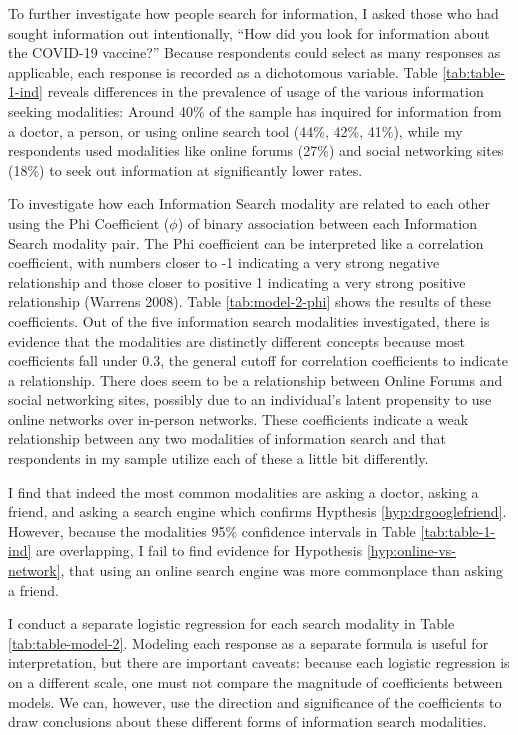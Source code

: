 To further investigate how people search for information, I asked those who had
sought information out intentionally, ``How did you look for information about
the COVID-19 vaccine?'' Because respondents could select as many responses as
applicable, each response is recorded as a dichotomous variable. Table
\ref{tab:table-1-ind} reveals differences in the prevalence of usage of the
various information seeking modalities: Around 40\% of the sample has inquired for
information from a doctor, a person, or using online search tool (44\%, 42\%, 41\%), while my
respondents used modalities like online forums (27\%) and social networking sites (18\%)
to seek out information at significantly lower rates.

To investigate how each
Information Search modality are related to each other using the Phi Coefficient
($\phi$) of binary association between each Information Search modality pair.
The Phi coefficient can be interpreted like a correlation coefficient, with
numbers closer to -1 indicating a very strong negative relationship and those closer to 
positive 1 indicating a very strong positive relationship
(Warrens 2008). Table \ref{tab:model-2-phi} shows the results of these
coefficients. Out of the five information search modalities investigated, there is
evidence that the modalities are distinctly different concepts because most
coefficients fall under 0.3, the general cutoff for correlation
coefficients to indicate a relationship. There does seem to be a relationship
between Online Forums and social networking sites, possibly due to an
individual's latent propensity to use online networks over in-person networks. These
coefficients indicate a weak relationship between any two modalities of
information search and that respondents in my sample utilize each of these a
little bit differently. 

I find that indeed the most common modalities are 
asking a doctor, asking a friend, and asking a search engine which confirms
Hypthesis \ref{hyp:drgooglefriend}. However, because the modalities 95\% confidence intervals 
in Table \ref{tab:table-1-ind}
are overlapping, I fail to find evidence for Hypothesis \ref{hyp:online-vs-network},
that using an online search engine was more commonplace than asking a friend. 



I conduct a separate logistic regression for each search modality in Table \ref{tab:table-model-2}. 
Modeling each response as a separate formula is useful for interpretation, but
there are important caveats: because each logistic regression is on a different
scale, one must not compare the magnitude of coefficients between models. We
can, however, use the direction and significance of the coefficients to draw
conclusions about these different forms of information search modalities.

